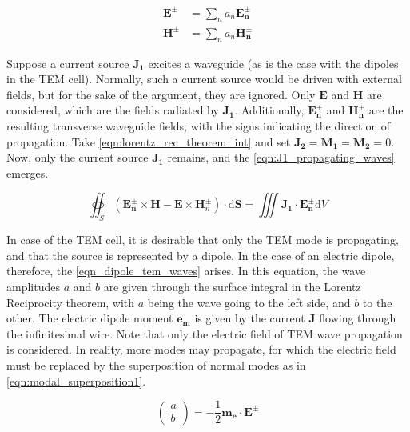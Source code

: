 \begin{align}
    \mathbf{E^\pm}&=\sum_na_n\mathbf{E_n^\pm}    \label{eqn:modal_superposition1}\\
    \mathbf{H^\pm}&=\sum_na_n\mathbf{H_n^\pm}    \label{eqn:modal_superposition2}
\end{align}

Suppose a current source $\mathbf{J_1}$ excites a waveguide (as is the case with the dipoles in the TEM cell). Normally, such a current source would be driven with external fields, but for the sake of the argument, they are ignored. Only $\mathbf{E}$ and $\mathbf{H}$ are considered, which are the fields radiated by $\mathbf{J_1}$. Additionally, $\mathbf{E_n^\pm}$ and $\mathbf{H_n^\pm}$ are the resulting transverse waveguide fields, with the signs indicating the direction of propagation. Take \autoref{eqn:lorentz_rec_theorem_int} and set $\mathbf{J_2}=\mathbf{M_1}=\mathbf{M_2}=0$. Now, only the current source $\mathbf{J_1}$ remains, and the \autoref{eqn:J1_propagating_waves} emerges. %

\begin{equation}
    \oiint _S (\mathbf{E_n^\pm}\times \mathbf{H}-\mathbf{E}\times \mathbf{H}_n^\pm)\cdot\mathrm{d}\mathbf{S}=\iiint \mathbf{J_1}\cdot\mathbf{E_n^\pm}\mathrm{d}V
    \label{eqn:J1_propagating_waves}
\end{equation}

In case of the TEM cell, it is desirable that only the TEM mode is propagating, and that the source is represented by a dipole. In the case of an electric dipole, therefore, the \autoref{eqn_dipole_tem_waves} arises. In this equation, the wave amplitudes $a$ and $b$ are given through the surface integral in the Lorentz Reciprocity theorem, with $a$ being the wave going to the left side, and $b$ to the other. The electric dipole moment $\mathbf{e_m}$ is given by the current $\mathbf{J}$ flowing through the infinitesimal wire. Note that only the electric field of TEM wave propagation is considered. In reality, more modes may propagate, for which the electric field must be replaced by the superposition of normal modes as in \autoref{eqn:modal_superposition1}.

\begin{equation}
\begin{pmatrix}a \\b\end{pmatrix} = -\frac{1}{2}\mathbf{m_e}\cdot \mathbf{E}^\pm
\label{eqn_dipole_tem_waves}
\end{equation}

